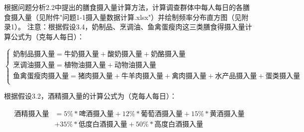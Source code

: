 \documentclass{article}
\numberwithin{equation}{subsection}
\begin{document}
\begin{table}[H]
    \centering
    \caption{平衡膳食八准则之定量型标准\\（注：根据假设3.5，奶制品的标准摄入量200-500g）}
\end{table}

根据问题分析2.2中提出的膳食摄入量计算方法，计算调查群体中每人每日的各膳食摄入量（见附件"问题1-1摄入量数据计算.xlsx"）并绘制频率分布直方图（见附录1）。
注意：根据假设3.4，奶制品、烹调油、鱼禽蛋瘦肉这三类膳食得摄入量计算公式为（克每人每日）：

\begin{equation}
    \left\{\begin{array}{l}
        \text{奶制品摄入量} = \text{牛奶摄入量} + \text{酸奶摄入量} + \text{奶酪摄入量} \\
        \text{烹调油摄入量} = \text{植物油摄入量} + \text{动物油摄入量} \\
        \text{鱼禽蛋瘦肉摄入量} = \text{猪肉摄入量} + \text{牛羊肉摄入量} + \text{禽肉摄入量} + \text{水产品摄入量} + \text{蛋类摄入量}\\
    \end{array}\right.
\end{equation}

根据假设3.2，酒精摄入量的计算公式为（克每人每日）：

\begin{equation}
    \begin{aligned}
        \text{酒精摄入量}
        &=5\%*\text{啤酒摄入量}+12\%*\text{葡萄酒摄入量}+15\%*\text{黄酒摄入量}\\
        &+35\%*\text{低度白酒摄入量}+50\%*\text{高度白酒摄入量} \\
    \end{aligned}
\end{equation}
\end{document}
